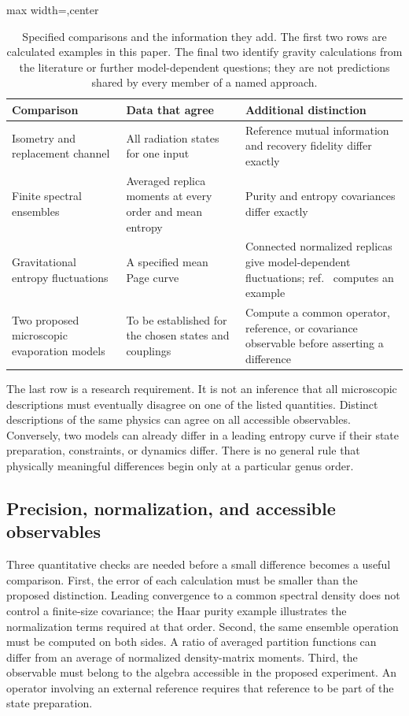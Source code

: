\documentclass[11pt,letterpaper]{article}
\theoremstyle{plain}
\theoremstyle{definition}
\theoremstyle{remark}
\begin{document}
\begin{table}[tbp]
\centering
\caption{Specified comparisons and the information they add. The first
two rows are calculated examples in this paper. The final two identify
gravity calculations from the literature or further model-dependent
questions; they are not predictions shared by every member of a named
approach.}
\label{tab13:discrimination_matrix}
\begin{adjustbox}{max width=\textwidth,center}
\begin{tabular}{p{}p{}p{}}
\toprule
Comparison & Data that agree & Additional distinction \\
\midrule
Isometry and replacement channel & All radiation states for one input
& Reference mutual information and recovery fidelity differ exactly \\[4pt]
Finite spectral ensembles & Averaged replica moments at every order
and mean entropy & Purity and entropy covariances differ exactly \\[4pt]
Gravitational entropy fluctuations & A specified mean Page curve
& Connected normalized replicas give model-dependent fluctuations;
ref.~\cite{boussomiyaji2024} computes an example \\[4pt]
Two proposed microscopic evaporation models & To be established for the
chosen states and couplings & Compute a common operator, reference, or
covariance observable before asserting a difference \\
\bottomrule
\end{tabular}
\end{adjustbox}
\end{table}

The last row is a research requirement. It is not an inference that all
microscopic descriptions must eventually disagree on one of the listed
quantities. Distinct descriptions of the same physics can agree on all
accessible observables. Conversely, two models can already differ in a
leading entropy curve if their state preparation, constraints, or
dynamics differ. There is no general rule that physically meaningful
differences begin only at a particular genus order.

\subsection{Precision, normalization, and accessible observables}

Three quantitative checks are needed before a small difference becomes
a useful comparison. First, the error of each calculation must be
smaller than the proposed distinction. Leading convergence to a common
spectral density does not control a finite-size covariance; the Haar
purity example illustrates the normalization terms required at that
order. Second, the same ensemble operation must be computed on both
sides. A ratio of averaged partition functions can differ from an
average of normalized density-matrix moments. Third, the observable
must belong to the algebra accessible in the proposed experiment.
An operator involving an external reference requires that reference
to be part of the state preparation.
\end{document}
